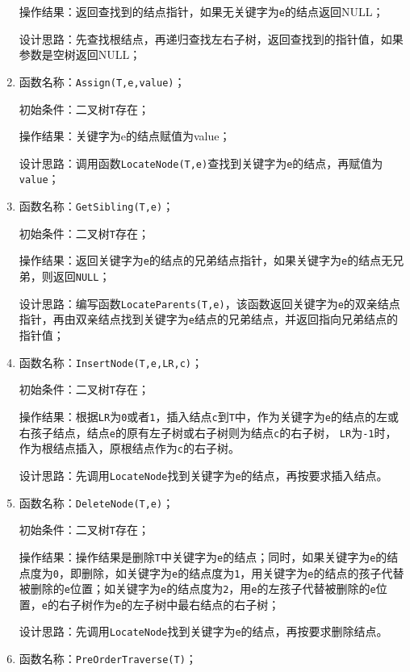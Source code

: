 \documentclass[supercite]{Experimental_Report}
\theoremstyle{definition}
\begin{document}
\begin{enumerate}
	操作结果：返回查找到的结点指针，如果无关键字为\verb|e|的结点返回NULL；

	设计思路：先查找根结点，再递归查找左右子树，返回查找到的指针值，如果参数是空树返回NULL；

	\item 函数名称：\verb|Assign(T,e,value)|；
	
	初始条件：二叉树\verb|T|存在；

	操作结果：关键字为e的结点赋值为value；

	设计思路：调用函数\verb|LocateNode(T,e)|查找到关键字为\verb|e|的结点，再赋值为\verb|value|；

	\item 函数名称：\verb|GetSibling(T,e)|；
	
	初始条件：二叉树\verb|T|存在；

	操作结果：返回关键字为\verb|e|的结点的兄弟结点指针，如果关键字为\verb|e|的结点无兄弟，则返回\verb|NULL|；

	设计思路：编写函数\verb|LocateParents(T,e)|，该函数返回关键字为\verb|e|的双亲结点指针，再由双亲结点找到关键字为\verb|e|结点的兄弟结点，并返回指向兄弟结点的指针值；

	\item 函数名称：\verb|InsertNode(T,e,LR,c)|；
	
	初始条件：二叉树\verb|T|存在；

	操作结果：根据\verb|LR|为\verb|0|或者\verb|1|，插入结点\verb|c|到\verb|T|中，作为关键字为\verb|e|的结点的左或右孩子结点，结点\verb|e|的原有左子树或右子树则为结点\verb|c|的右子树，
	\verb|LR|为\verb|-1|时，作为根结点插入，原根结点作为\verb|c|的右子树。

	设计思路：先调用\verb|LocateNode|找到关键字为\verb|e|的结点，再按要求插入结点。

	\item 函数名称：\verb|DeleteNode(T,e)|；
	
	初始条件：二叉树\verb|T|存在；

	操作结果：操作结果是删除\verb|T|中关键字为\verb|e|的结点；同时，如果关键字为\verb|e|的结点度为\verb|0|，即删除，如关键字为\verb|e|的结点度为\verb|1|，用关键字为\verb|e|的结点的孩子代替被删除的\verb|e|位置；如关键字为\verb|e|的结点度为\verb|2|，用\verb|e|的左孩子代替被删除的\verb|e|位置，\verb|e|的右子树作为\verb|e|的左子树中最右结点的右子树；

	设计思路：先调用\verb|LocateNode|找到关键字为\verb|e|的结点，再按要求删除结点。

	\item 函数名称：\verb|PreOrderTraverse(T)|；
	

\end{enumerate}
\end{document}
